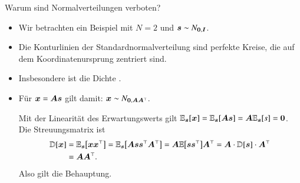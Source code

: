 \begin{frame}{Warum sind Normalverteilungen verboten?}{}
	\begin{itemize}
		\item Wir betrachten ein Beispiel mit $N = 2$ und $\bm{s} \sim N_{\bm{0}, \bm{I}}$.
		\item Die Konturlinien der Standardnormalverteilung sind perfekte Kreise, die auf dem Koordinatenursprung zentriert sind.
		\item Insbesondere ist die Dichte .
		\item Für $\bm{x} = \bm{A} \bm{s}$ gilt damit: $\bm{x} \sim N_{\bm{0}, \bm{A} \bm{A}^\top}$. \\ \vspace*{2mm}
		\begin{myproof}
			Mit der Linearität des Erwartungswerts gilt $\mathbb{E}_{\bm{s}}[\bm{x}] = \mathbb{E}_{\bm{s}}[\bm{A} \bm{s}] = \bm{A} \mathbb{E}_{\bm{s}}[s] = \bm{0}$.
			Die Streuungsmatrix ist
			\begin{align*}
				\mathbb{D}[\bm{x}]
					&= \mathbb{E}_{\bm{s}}\bigl[ \bm{x} \bm{x}^\top \bigr]
						= \mathbb{E}_{\bm{s}}\bigl[ \bm{A} \bm{s} \bm{s}^\top \bm{A}^\top \bigr]
						= \bm{A} \mathbb{E}\bigl[ \bm{s} \bm{s}^\top \bigr] \bm{A}^\top
						= \bm{A} \cdot \mathbb{D}[\bm{s}] \cdot \bm{A}^\top
			\\
					&= \bm{A} \bm{A}^\top.
			\end{align*}
			Also gilt die Behauptung.
		\end{myproof} 
	\end{itemize}
\end{frame}


